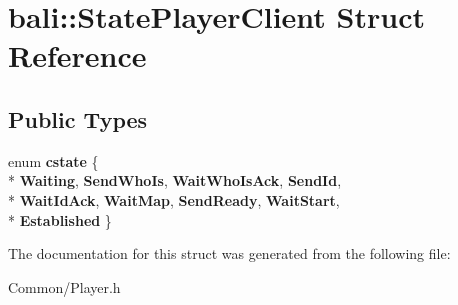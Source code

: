 \hypertarget{structbali_1_1_state_player_client}{\section{bali\-:\-:State\-Player\-Client Struct Reference}
\label{structbali_1_1_state_player_client}
}
\subsection*{Public Types}
\begin{DoxyCompactItemize}
\item 
enum {\bfseries cstate} \{ \\*
{\bfseries Waiting}, 
{\bfseries Send\-Who\-Is}, 
{\bfseries Wait\-Who\-Is\-Ack}, 
{\bfseries Send\-Id}, 
\\*
{\bfseries Wait\-Id\-Ack}, 
{\bfseries Wait\-Map}, 
{\bfseries Send\-Ready}, 
{\bfseries Wait\-Start}, 
\\*
{\bfseries Established}
 \}
\end{DoxyCompactItemize}


The documentation for this struct was generated from the following file\-:\begin{DoxyCompactItemize}
\item 
Common/Player.\-h\end{DoxyCompactItemize}

